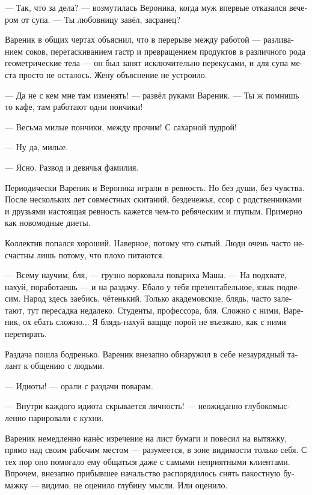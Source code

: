 \documentclass[a5paper,12pt,fleqn]{extbook}\usepackage{cooltooltips}\usepackage{polyglossia}\setdefaultlanguage[babelshorthands=true]{russian}\setotherlanguage{english}\defaultfontfeatures{Ligatures=TeX,Mapping=tex-text} \usepackage{xcolor}\definecolor{lightgray}{HTML}{bbbbbb}\color{lightgray}\newcommand{\ml}[3]{\textenglish{\textcolor{black}{#3}}}
\newcommand{\asterism}{\vspace{1em}{\centering\Large\bfseries$\ast~\ast~\ast$\par}\vspace{1em}}
\begin{document}
--- Так, что за дела? --- возмутилась Вероника, когда муж впервые отказался вечером от супа.
--- Ты любовницу завёл, засранец?

Вареник в общих чертах объяснил, что в перерыве между работой --- разливанием соков, перетаскиванием гастр и превращением продуктов в различного рода геометрические тела --- он был занят исключительно перекусами, и для супа места просто не осталось.
Жену объяснение не устроило.

--- Да не с кем мне там изменять! --- развёл руками Вареник.
--- Ты ж помнишь то кафе, там работают одни пончики!

--- Весьма милые пончики, между прочим!
С сахарной пудрой!

--- Ну да, милые.

--- Ясно.
Развод и девичья фамилия.

Периодически Вареник и Вероника играли в ревность.
Но без души, без чувства.
После нескольких лет совместных скитаний, безденежья, ссор с родственниками и друзьями настоящая ревность кажется чем-то ребяческим и глупым.
Примерно как новомодные диеты.

\asterism

Коллектив попался хороший.
Наверное, потому что сытый.
Люди очень часто несчастны лишь потому, что плохо питаются.

--- Всему научим, бля, --- грузно ворковала повариха Маша.
--- На подхвате, нахуй, поработаешь --- и на раздачу.
Ебало у тебя презентабельное, язык подвесим.
Народ здесь заебись, чётенький.
Только академовские, блядь, часто залетают, тут пересадка недалеко.
Студенты, профессора, бля.
Сложно с ними, Вареник, ох ебать сложно...
Я блядь-нахуй ващще порой не въезжаю, как с ними перетирать.

Раздача пошла бодренько.
Вареник внезапно обнаружил в себе незаурядный талант к общению с людьми.

--- Идиоты! --- орали с раздачи поварам.

--- Внутри каждого идиота скрывается личность! --- неожиданно глубокомысленно парировали с кухни.

Вареник немедленно нанёс изречение на лист бумаги и повесил на вытяжку, прямо над своим рабочим местом --- разумеется, в зоне видимости только себя.
С тех пор оно помогало ему общаться даже с самыми неприятными клиентами.
Впрочем, внезапно прибывшее начальство распорядилось снять пакостную бумажку --- видимо, не оценило глубину мысли.
Или оценило.

\asterism
\end{document}
